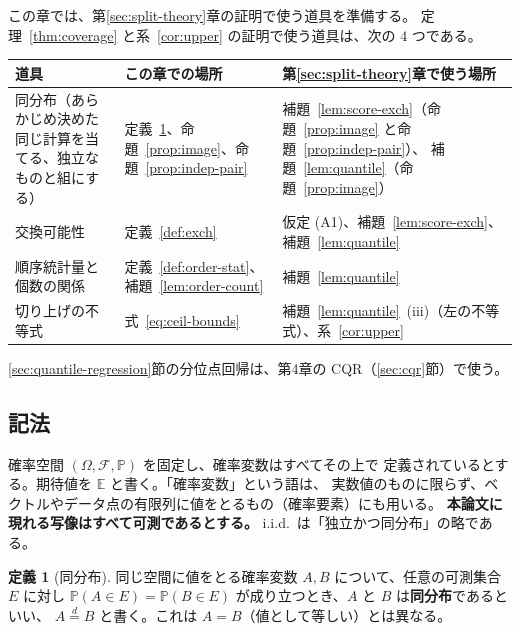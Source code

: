 \documentclass[a4paper,11pt]{jsarticle}
\theoremstyle{definition}
\newtheorem{definition}{定義}[section]
\theoremstyle{plain}
\theoremstyle{remark}
\newcommand{\Prob}{\mathbb{P}}
\newcommand{\Exp}{\mathbb{E}}
\newcommand{\eqd}{\overset{d}{=}}               %
\begin{document}
この章では、第\ref{sec:split-theory}章の証明で使う道具を準備する。
定理~\ref{thm:coverage} と系~\ref{cor:upper} の証明で使う道具は、次の $4$ つである。
\begin{center}
  \small
  \begin{tabular}{p{}p{}p{}}
    \toprule
    道具 & この章での場所 & 第\ref{sec:split-theory}章で使う場所 \\
    \midrule
    同分布（あらかじめ決めた同じ計算を当てる、独立なものと組にする）
      & 定義~\ref{def:eqd}、命題~\ref{prop:image}、命題~\ref{prop:indep-pair}
      & 補題~\ref{lem:score-exch}（命題~\ref{prop:image} と命題~\ref{prop:indep-pair}）、
        補題~\ref{lem:quantile}（命題~\ref{prop:image}） \\
    交換可能性
      & 定義~\ref{def:exch}
      & 仮定 (A1)、補題~\ref{lem:score-exch}、補題~\ref{lem:quantile} \\
    順序統計量と個数の関係
      & 定義~\ref{def:order-stat}、補題~\ref{lem:order-count}
      & 補題~\ref{lem:quantile} \\
    切り上げの不等式
      & 式~\eqref{eq:ceil-bounds}
      & 補題~\ref{lem:quantile}~(iii)（左の不等式）、系~\ref{cor:upper} \\
    \bottomrule
  \end{tabular}
\end{center}
\ref{sec:quantile-regression}節の分位点回帰は、第4章の CQR（\ref{sec:cqr}節）で使う。

\subsection{記法}
\label{sec:notation}

確率空間 $(\Omega,\mathcal{F},\Prob)$ を固定し、確率変数はすべてその上で
定義されているとする。期待値を $\Exp$ と書く。「確率変数」という語は、
実数値のものに限らず、ベクトルやデータ点の有限列に値をとるもの（確率要素）にも用いる。
\textbf{本論文に現れる写像はすべて可測であるとする。}
i.i.d.\ は「独立かつ同分布」の略である。

\begin{definition}[同分布]
  \label{def:eqd}
  同じ空間に値をとる確率変数 $A,B$ について、任意の可測集合 $E$ に対し
  $\Prob(A\in E)=\Prob(B\in E)$ が成り立つとき、$A$ と $B$ は\textbf{同分布}であるといい、
  $A\eqd B$ と書く。これは $A=B$（値として等しい）とは異なる。
\end{definition}
\end{document}

